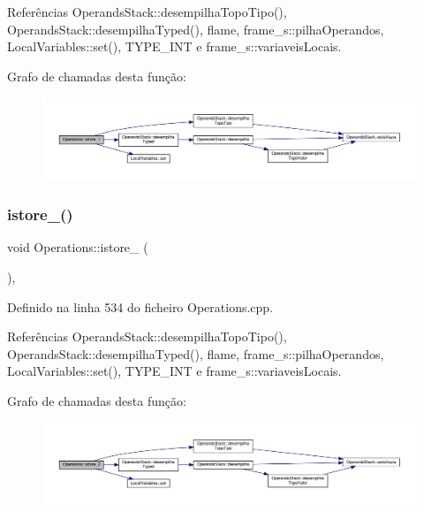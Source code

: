 Referências Operands\+Stack\+::desempilha\+Topo\+Tipo(), Operands\+Stack\+::desempilha\+Typed(), flame, frame\+\_\+s\+::pilha\+Operandos, Local\+Variables\+::set(), T\+Y\+P\+E\+\_\+\+I\+NT e frame\+\_\+s\+::variaveis\+Locais.

Grafo de chamadas desta função\+:
\nopagebreak
\begin{figure}[H]
\begin{center}
\leavevmode
\includegraphics[width=350pt]{classOperations_aeb89677195b16d5c595ec9faaddc2c76_cgraph}
\end{center}
\end{figure}
\mbox{\label{classOperations_a0fbc901b4c88aef8455b30d9b2063447}} 
\subsubsection{\texorpdfstring{istore\+\_()}{istore\_2()}}
{\footnotesize\ttfamily void Operations\+::istore\+\_ (\begin{DoxyParamCaption}{ }\end{DoxyParamCaption})\hspace{0.3cm}{\ttfamily [static]}, {\ttfamily [private]}}



Definido na linha 534 do ficheiro Operations.\+cpp.



Referências Operands\+Stack\+::desempilha\+Topo\+Tipo(), Operands\+Stack\+::desempilha\+Typed(), flame, frame\+\_\+s\+::pilha\+Operandos, Local\+Variables\+::set(), T\+Y\+P\+E\+\_\+\+I\+NT e frame\+\_\+s\+::variaveis\+Locais.

Grafo de chamadas desta função\+:
\nopagebreak
\begin{figure}[H]
\begin{center}
\leavevmode
\includegraphics[width=350pt]{classOperations_a0fbc901b4c88aef8455b30d9b2063447_cgraph}
\end{center}
\end{figure}
\mbox{\label{classOperations_a3ff20f0475eaaa28501ea330074f5cb7}} 
